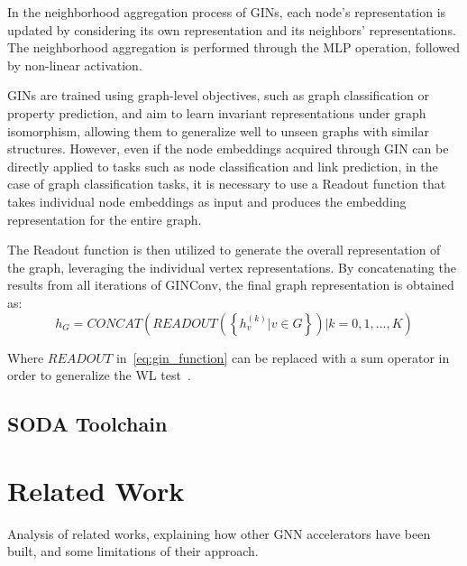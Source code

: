 \documentclass{Configuration_Files/PoliMi3i_thesis}
\begin{document}
    In the neighborhood aggregation process of GINs, each node's representation is updated by considering its own representation and its neighbors' representations.
    The neighborhood aggregation is performed through the MLP operation, followed by non-linear activation.

    GINs are trained using graph-level objectives, such as graph classification or property prediction, and aim to learn invariant representations under graph isomorphism, allowing them to generalize well to unseen graphs with similar structures.
    However, even if the node embeddings acquired through GIN can be directly applied to tasks such as node classification and link prediction, in the case of graph classification tasks, it is necessary to use a Readout function that takes individual node embeddings as input and produces the embedding representation for the entire graph.

    The Readout function is then utilized to generate the overall representation of the graph, leveraging the individual vertex representations.
    By concatenating the results from all iterations of GINConv, the final graph representation is obtained as:
    \begin{equation}
        \label{eq:gin_readout}
        h_G = CONCAT \left( READOUT \left( \left\{ h_v^{(k)} | v \in G \right\} \right) | k = 0, 1, ..., K \right)
    \end{equation}

    Where $READOUT$ in~\ref{eq:gin_function} can be replaced with a sum operator in order to generalize the WL test~\cite{xu2019powerful}.

    \section{SODA Toolchain}




    \chapter{Related Work}
    \label{ch:chapter_three}%

    Analysis of related works, explaining how other GNN accelerators have been built, and some
    limitations of their approach.

\end{document}
